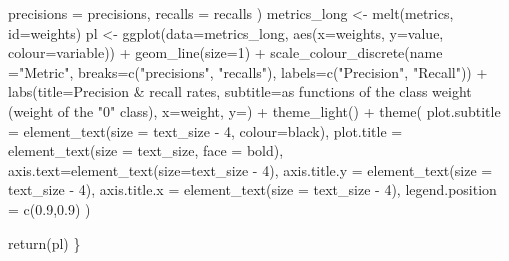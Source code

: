\documentclass[
]{report}
\newenvironment{Shaded}{\begin{snugshade}}{\end{snugshade}}
\newcommand{\AttributeTok}[1]{\textcolor[rgb]{0.77,0.63,0.00}{#1}}
\newcommand{\DecValTok}[1]{\textcolor[rgb]{0.00,0.00,0.81}{#1}}
\newcommand{\FloatTok}[1]{\textcolor[rgb]{0.00,0.00,0.81}{#1}}
\newcommand{\FunctionTok}[1]{\textcolor[rgb]{0.00,0.00,0.00}{#1}}
\newcommand{\NormalTok}[1]{#1}
\newcommand{\OtherTok}[1]{\textcolor[rgb]{0.56,0.35,0.01}{#1}}
\newcommand{\SpecialCharTok}[1]{\textcolor[rgb]{0.00,0.00,0.00}{#1}}
\newcommand{\StringTok}[1]{\textcolor[rgb]{0.31,0.60,0.02}{#1}}
\begin{document}
\begin{Shaded}
\begin{Highlighting}[]
    \AttributeTok{precisions =}\NormalTok{ precisions,}
    \AttributeTok{recalls =}\NormalTok{ recalls}
\NormalTok{  )}
\NormalTok{  metrics\_long }\OtherTok{\textless{}{-}} \FunctionTok{melt}\NormalTok{(metrics, }\AttributeTok{id=}\StringTok{\textquotesingle{}weights\textquotesingle{}}\NormalTok{)}
\NormalTok{  pl }\OtherTok{\textless{}{-}} \FunctionTok{ggplot}\NormalTok{(}\AttributeTok{data=}\NormalTok{metrics\_long, }\FunctionTok{aes}\NormalTok{(}\AttributeTok{x=}\NormalTok{weights, }\AttributeTok{y=}\NormalTok{value, }\AttributeTok{colour=}\NormalTok{variable)) }\SpecialCharTok{+}
    \FunctionTok{geom\_line}\NormalTok{(}\AttributeTok{size=}\DecValTok{1}\NormalTok{) }\SpecialCharTok{+}
    \FunctionTok{scale\_colour\_discrete}\NormalTok{(}\AttributeTok{name =}\StringTok{"Metric"}\NormalTok{,}
                          \AttributeTok{breaks=}\FunctionTok{c}\NormalTok{(}\StringTok{"precisions"}\NormalTok{, }\StringTok{"recalls"}\NormalTok{),}
                          \AttributeTok{labels=}\FunctionTok{c}\NormalTok{(}\StringTok{"Precision"}\NormalTok{, }\StringTok{"Recall"}\NormalTok{)) }\SpecialCharTok{+}
    \FunctionTok{labs}\NormalTok{(}\AttributeTok{title=}\StringTok{\textquotesingle{}Precision \& recall rates\textquotesingle{}}\NormalTok{,}
         \AttributeTok{subtitle=}\StringTok{\textquotesingle{}as functions of the class weight (weight of the "0" class)\textquotesingle{}}\NormalTok{,}
         \AttributeTok{x=}\StringTok{\textquotesingle{}weight\textquotesingle{}}\NormalTok{, }\AttributeTok{y=}\StringTok{\textquotesingle{}\textquotesingle{}}\NormalTok{) }\SpecialCharTok{+}
     \FunctionTok{theme\_light}\NormalTok{() }\SpecialCharTok{+}
      \FunctionTok{theme}\NormalTok{(}
        \AttributeTok{plot.subtitle =} \FunctionTok{element\_text}\NormalTok{(}\AttributeTok{size =}\NormalTok{ text\_size }\SpecialCharTok{{-}} \DecValTok{4}\NormalTok{, }\AttributeTok{colour=}\StringTok{\textquotesingle{}black\textquotesingle{}}\NormalTok{),}
        \AttributeTok{plot.title =} \FunctionTok{element\_text}\NormalTok{(}\AttributeTok{size =}\NormalTok{ text\_size, }\AttributeTok{face =} \StringTok{\textquotesingle{}bold\textquotesingle{}}\NormalTok{),}
        \AttributeTok{axis.text=}\FunctionTok{element\_text}\NormalTok{(}\AttributeTok{size=}\NormalTok{text\_size }\SpecialCharTok{{-}} \DecValTok{4}\NormalTok{), }
        \AttributeTok{axis.title.y =} \FunctionTok{element\_text}\NormalTok{(}\AttributeTok{size =}\NormalTok{ text\_size }\SpecialCharTok{{-}} \DecValTok{4}\NormalTok{), }
        \AttributeTok{axis.title.x =} \FunctionTok{element\_text}\NormalTok{(}\AttributeTok{size =}\NormalTok{ text\_size }\SpecialCharTok{{-}} \DecValTok{4}\NormalTok{),}
        \AttributeTok{legend.position =} \FunctionTok{c}\NormalTok{(}\FloatTok{0.9}\NormalTok{,}\FloatTok{0.9}\NormalTok{)}
\NormalTok{      )}
    
  \FunctionTok{return}\NormalTok{(pl)}
\NormalTok{\}}
\end{Highlighting}
\end{Shaded}
\end{document}
